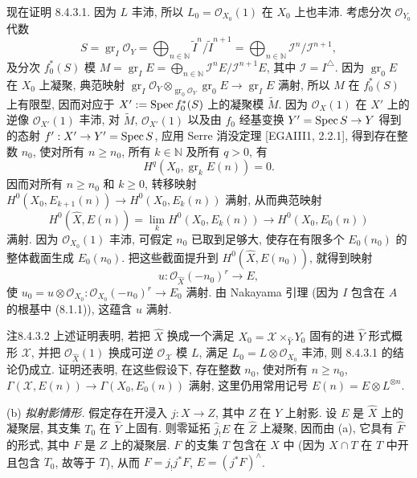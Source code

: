 现在证明 8.4.3.1. 因为 $L$ 丰沛, 所以 $L_0=\mathcal O_{X_0}(1)$ 在 $X_0$ 上也丰沛. 考虑分次 $\mathcal O_{Y_0}$ 代数
\[S=\operatorname{gr}_I\mathcal O_Y=\bigoplus_{n\in\mathbb N}\widetilde I^n/\widetilde I^{n+1}=\bigoplus_{n\in\mathbb N}\mathcal I^n/\mathcal I^{n+1},\]
及分次 $f_0^*(S)$ 模 $M=\operatorname{gr}_IE=\bigoplus_{n\in\mathbb N}\mathcal I^nE/\mathcal I^{n+1}E$, 其中 $\mathcal I=I^\triangle$. 因为 $\operatorname{gr}_0E$
在 $X_0$ 上凝聚, 典范映射 $\operatorname{gr}_I\mathcal O_Y\otimes_{\operatorname{gr}_0\mathcal O_Y}\operatorname{gr}_0E\to\operatorname{gr}_IE$ 满射, 所以 $M$ 在 $f_0^*(S)$ 上有限型, 因而对应于 $X':=\operatorname{Spec} f_0^*(S)$ 上的凝聚模 $\widetilde M$. 因为 $\mathcal O_X(1)$ 在 $X'$ 上的逆像 $\mathcal O_{X'}(1)$ 丰沛, 对 $\widetilde M$, $\mathcal O_{X'}(1)$ 以及由 $f_0$ 经基变换 $Y'=\operatorname{Spec} S\to Y$ 得到的态射 $f':X'\to Y'=\operatorname{Spec} S$, 应用 Serre 消没定理 [EGAIII1, 2.2.1], 得到存在整数 $n_0$, 使对所有 $n\geq n_0$, 所有 $k\in\mathbb N$ 及所有 $q>0$, 有
\[H^q(X_0,\operatorname{gr}_kE(n))=0.\]
因而对所有 $n\geq n_0$ 和 $k\geq0$, 转移映射 $H^0(X_0,E_{k+1}(n))\to H^0(X_0,E_k(n))$ 满射, 从而典范映射
\[H^0(\widehat X,E(n))=\lim_kH^0(X_0,E_k(n))\longrightarrow H^0(X_0,E_0(n))\]
满射. 因为 $\mathcal O_{X_0}(1)$ 丰沛, 可假定 $n_0$ 已取到足够大, 使存在有限多个 $E_0(n_0)$ 的整体截面生成 $E_0(n_0)$. 把这些截面提升到 $H^0(\widehat X,E(n_0))$, 就得到映射
\[u:\mathcal O_{\widehat X}(-n_0)^r\longrightarrow E,\]
使 $u_0=u\otimes\mathcal O_{X_0}:\mathcal O_{X_0}(-n_0)^r\to E_0$ 满射. 由 Nakayama 引理 (因为 $I$ 包含在 $A$ 的根基中 (8.1.1)), 这蕴含 $u$ 满射.

\begin{origstatement}{注}{8.4.3.2}\label{ch08:rem8432}
上述证明表明, 若把 $\widehat X$ 换成一个满足 $X_0=\mathcal X\times_{\widehat Y}Y_0$ 固有的进 $\widehat Y$ 形式概形 $\mathcal X$, 并把 $\mathcal O_{\widehat X}(1)$ 换成可逆 $\mathcal O_{\mathcal X}$ 模 $L$, 满足 $L_0=L\otimes\mathcal O_{X_0}$ 丰沛, 则 8.4.3.1 的结论仍成立. 证明还表明, 在这些假设下, 存在整数 $n_0$, 使对所有 $n\geq n_0$, $\Gamma(\mathcal X,E(n))\to\Gamma(X_0,E_0(n))$ 满射, 这里仍用常用记号 $E(n)=E\otimes L^{\otimes n}$.
\end{origstatement}

(b) \emph{拟射影情形.} 假定存在开浸入 $j:X\to Z$, 其中 $Z$ 在 $Y$ 上射影. 设 $E$ 是 $\widehat X$ 上的凝聚层, 其支集 $T_0$ 在 $\widehat Y$ 上固有. 则零延拓 $\widehat j_!E$ 在 $\widehat Z$ 上凝聚, 因而由 (a), 它具有 $\widehat F$ 的形式, 其中 $F$ 是 $Z$ 上的凝聚层. $F$ 的支集 $T$ 包含在 $X$ 中 (因为 $X\cap T$ 在 $T$ 中开且包含 $T_0$, 故等于 $T$), 从而 $F=j_!j^*F$, $E=(j^*F)^\wedge$.

